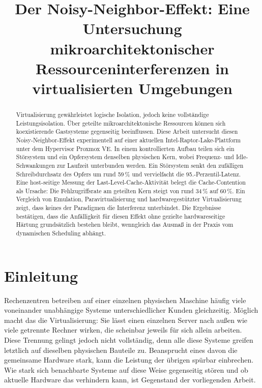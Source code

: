 \documentclass[conference]{IEEEtran}
\begin{document}
\title{Der Noisy-Neighbor-Effekt: Eine Untersuchung mikroarchitektonischer Ressourceninterferenzen in virtualisierten Umgebungen}

\author{
}

\maketitle

\begin{abstract}
Virtualisierung gewährleistet logische Isolation, jedoch keine vollständige Leistungsisolation. Über geteilte mikroarchitektonische Ressourcen können sich koexistierende Gastsysteme gegenseitig beeinflussen. Diese Arbeit untersucht diesen Noisy-Neighbor-Effekt experimentell auf einer aktuellen Intel-Raptor-Lake-Plattform unter dem Hypervisor Proxmox VE. In einem kontrollierten Aufbau teilen sich ein Störsystem und ein Opfersystem denselben physischen Kern, wobei Frequenz- und Idle-Schwankungen zur Laufzeit unterbunden werden. Ein Störsystem senkt den zufälligen Schreibdurchsatz des Opfers um rund 59\,\% und vervielfacht die 95.-Perzentil-Latenz. Eine host-seitige Messung der Last-Level-Cache-Aktivität belegt die Cache-Contention als Ursache: Die Fehlzugriffsrate am geteilten Kern steigt von rund 34\,\% auf 60\,\%. Ein Vergleich von Emulation, Paravirtualisierung und hardwaregestützter Virtualisierung zeigt, dass keines der Paradigmen die Interferenz unterbindet. Die Ergebnisse bestätigen, dass die Anfälligkeit für diesen Effekt ohne gezielte hardwareseitige Härtung grundsätzlich bestehen bleibt, wenngleich das Ausmaß in der Praxis vom dynamischen Scheduling abhängt.
\end{abstract}

\section{Einleitung}
Rechenzentren betreiben auf einer einzelnen physischen Maschine häufig viele voneinander unabhängige Systeme unterschiedlicher Kunden gleichzeitig. Möglich macht das die Virtualisierung: Sie lässt einen einzelnen Server nach außen wie viele getrennte Rechner wirken, die scheinbar jeweils für sich allein arbeiten. Diese Trennung gelingt jedoch nicht vollständig, denn alle diese Systeme greifen letztlich auf dieselben physischen Bauteile zu. Beansprucht eines davon die gemeinsame Hardware stark, kann die Leistung der übrigen spürbar einbrechen. Wie stark sich benachbarte Systeme auf diese Weise gegenseitig stören und ob aktuelle Hardware das verhindern kann, ist Gegenstand der vorliegenden Arbeit.
\end{document}
